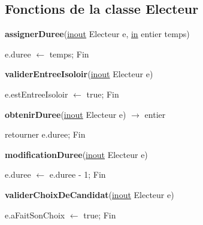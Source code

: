 \documentclass[12pt]{article} %
\begin{document}
\newpage
\subsection*{Fonctions de la classe Electeur}
\begin{algorithm}
	\caption{\textbf{assignerDuree}(\underline{inout} Electeur e, \underline{in} entier temps)}
	\begin{algorithmic}[1]
		\Start
		\State e.duree $\leftarrow$ temps;
		\State Fin
	\end{algorithmic}
\end{algorithm}

\begin{algorithm}
	\caption{\textbf{validerEntreeIsoloir}(\underline{inout} Electeur e)}
	\begin{algorithmic}[1]
		\Start
		\State e.estEntreeIsoloir $\leftarrow$ true;
		\State Fin
	\end{algorithmic}
\end{algorithm}

\begin{algorithm}
	\caption{\textbf{obtenirDuree}(\underline{inout} Electeur e) $\rightarrow$ entier}
	\begin{algorithmic}[1]
		\Start
		\State retourner e.duree;
		\State Fin
	\end{algorithmic}
\end{algorithm}

\newpage

\begin{algorithm}
	\caption{\textbf{modificationDuree}(\underline{inout} Electeur e)}
	\begin{algorithmic}[1]
		\Start
		\State e.duree $\leftarrow$ e.duree - 1;
		\State Fin
	\end{algorithmic}
\end{algorithm}

\begin{algorithm}
	\caption{\textbf{validerChoixDeCandidat}(\underline{inout} Electeur e)}
	\begin{algorithmic}[1]
		\Start
		\State e.aFaitSonChoix $\leftarrow$ true;
		\State Fin
	\end{algorithmic}
\end{algorithm}
\end{document}
